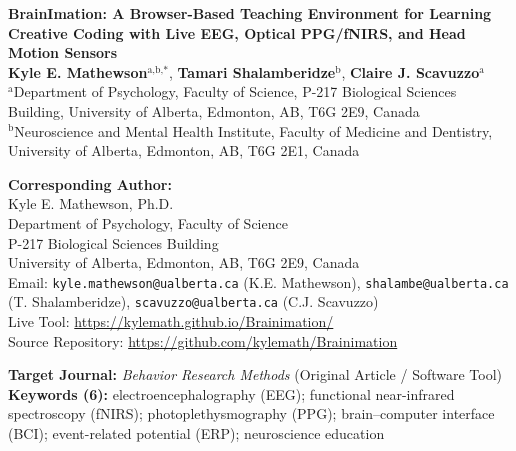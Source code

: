 \documentclass[11pt]{article}
\begin{document}
\begin{center}
{\LARGE \textbf{BrainImation: A Browser-Based Teaching Environment for Learning Creative Coding with Live EEG, Optical PPG/fNIRS, and Head Motion Sensors}}\\[16pt]

{\large \textbf{Kyle E. Mathewson}$^{\text{a,b,*}}$, \textbf{Tamari Shalamberidze}$^{\text{b}}$, \textbf{Claire J. Scavuzzo}$^{\text{a}}$}\\[10pt]
$^{\text{a}}$Department of Psychology, Faculty of Science, P-217 Biological Sciences Building, University of Alberta, Edmonton, AB, T6G 2E9, Canada\\
$^{\text{b}}$Neuroscience and Mental Health Institute, Faculty of Medicine and Dentistry, University of Alberta, Edmonton, AB, T6G 2E1, Canada\\[12pt]
\end{center}

\noindent\textbf{Corresponding Author:}\\
Kyle E. Mathewson, Ph.D.\\
Department of Psychology, Faculty of Science\\
P-217 Biological Sciences Building\\
University of Alberta, Edmonton, AB, T6G 2E9, Canada\\
Email: \texttt{kyle.mathewson@ualberta.ca} (K.E. Mathewson), \texttt{shalambe@ualberta.ca} (T. Shalamberidze), \texttt{scavuzzo@ualberta.ca} (C.J. Scavuzzo)\\
Live Tool: \url{https://kylemath.github.io/Brainimation/}\\
Source Repository: \url{https://github.com/kylemath/Brainimation}

\vspace{14pt}
\noindent\textbf{Target Journal:} \emph{Behavior Research Methods} (Original Article / Software Tool)\\[6pt]
\noindent\textbf{Keywords (6):} electroencephalography (EEG); functional near-infrared spectroscopy (fNIRS); photoplethysmography (PPG); brain--computer interface (BCI); event-related potential (ERP); neuroscience education

\vspace{14pt}
\end{document}

